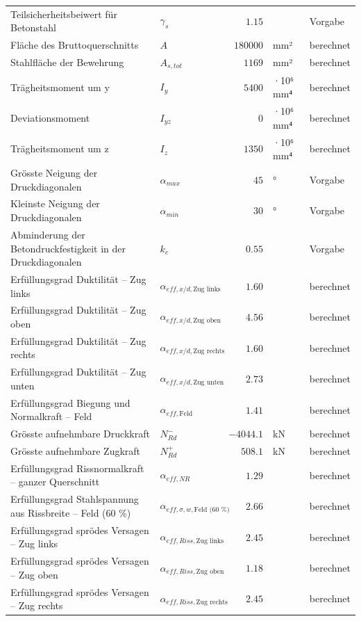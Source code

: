 \documentclass[11pt,a4paper]{article}
\begin{document}
\begin{xltabular}{\linewidth}{>{\raggedright\arraybackslash}Xlrll}
Teilsicherheitsbeiwert für Betonstahl & $\gamma_s$ & $1.15$ &  & Vorgabe \\
Fläche des Bruttoquerschnitts & $A$ & $180000$ & mm² & berechnet \\
Stahlfläche der Bewehrung & $A_{s,tot}$ & $1169$ & mm² & berechnet \\
Trägheitsmoment um y & $I_y$ & $5400$ & ·10⁶ mm⁴ & berechnet \\
Deviationsmoment & $I_{yz}$ & $0$ & ·10⁶ mm⁴ & berechnet \\
Trägheitsmoment um z & $I_z$ & $1350$ & ·10⁶ mm⁴ & berechnet \\
Grösste Neigung der Druckdiagonalen & $\alpha_{max}$ & $45$ & ° & Vorgabe \\
Kleinste Neigung der Druckdiagonalen & $\alpha_{min}$ & $30$ & ° & Vorgabe \\
Abminderung der Betondruckfestigkeit in der Druckdiagonalen & $k_c$ & $0.55$ &  & Vorgabe \\
Erfüllungsgrad Duktilität – Zug links & $\alpha_{eff,x/d,\text{Zug links}}$ & $1.60$ &  & berechnet \\
Erfüllungsgrad Duktilität – Zug oben & $\alpha_{eff,x/d,\text{Zug oben}}$ & $4.56$ &  & berechnet \\
Erfüllungsgrad Duktilität – Zug rechts & $\alpha_{eff,x/d,\text{Zug rechts}}$ & $1.60$ &  & berechnet \\
Erfüllungsgrad Duktilität – Zug unten & $\alpha_{eff,x/d,\text{Zug unten}}$ & $2.73$ &  & berechnet \\
Erfüllungsgrad Biegung und Normalkraft – Feld & $\alpha_{eff,\text{Feld}}$ & $1.41$ &  & berechnet \\
Grösste aufnehmbare Druckkraft & $N_{Rd}^{-}$ & $-4044.1$ & kN & berechnet \\
Grösste aufnehmbare Zugkraft & $N_{Rd}^{+}$ & $508.1$ & kN & berechnet \\
Erfüllungsgrad Rissnormalkraft – ganzer Querschnitt & $\alpha_{eff,NR}$ & $1.29$ &  & berechnet \\
Erfüllungsgrad Stahlspannung aus Rissbreite – Feld (60 \%) & $\alpha_{eff,\sigma,w,\text{Feld (60 \%)}}$ & $2.66$ &  & berechnet \\
Erfüllungsgrad sprödes Versagen – Zug links & $\alpha_{eff,Riss,\text{Zug links}}$ & $2.45$ &  & berechnet \\
Erfüllungsgrad sprödes Versagen – Zug oben & $\alpha_{eff,Riss,\text{Zug oben}}$ & $1.18$ &  & berechnet \\
Erfüllungsgrad sprödes Versagen – Zug rechts & $\alpha_{eff,Riss,\text{Zug rechts}}$ & $2.45$ &  & berechnet \\

\end{xltabular}
\end{document}
